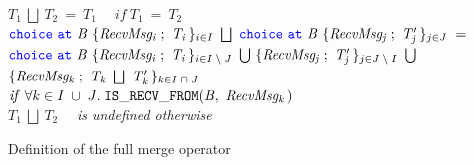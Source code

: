 \documentclass[12pt,twoside]{report}
\begin{document}
\begin{figure}[h]

    \centering

    $\mathit{T_1}\ \bigsqcup\ \mathit{T_2}\ =\ \mathit{T_1} \quad \; \mathit{if}\ \mathit{T_1}\ =\ \mathit{T_2}$\\[17pt]

    $\choice\ \at\ \mathit{B}\ \{\mathit{RecvMsg_i}\;;\ \mathit{T_i}\,\}_\varinset{i}{I}\ \bigsqcup\ \choice\ \at\ \mathit{B}\ \{\mathit{RecvMsg_j}\;;\ \mathit{T'_j}\,\}_\varinset{j}{J}\ =$\\[5pt]
    $\choice\ \at\ \mathit{B}\ \{\mathit{RecvMsg_i}\;;\ \mathit{T_i}\,\}_\varinset{i}{I\;\setminus\;J}\ \bigcup\ \{\mathit{RecvMsg_j}\;;\ \mathit{T'_j}\,\}_\varinset{j}{J\;\setminus\;I}\ \bigcup$\\
     $\{\mathit{RecvMsg_k}\;;\ \mathit{T_k}\ \bigsqcup\ \mathit{T'_k}\,\}_\varinset{k}{I\;\cap\;J}$\\[7.5pt]


    $\mathit{if}\ \forall \varinset{k}{I\;\cup\;J}.\;\mathtt{IS\_RECV\_FROM}(\mathit{B},\ \mathit{RecvMsg_k\,})$\\[14pt]




     $\mathit{T_1}\ \bigsqcup\ \mathit{T_2}$ \ \ \textit{is undefined otherwise}\\[7.5pt]

    \caption{Definition of the full merge operator}
    \label{fullmerge}
\end{figure}
\end{document}
